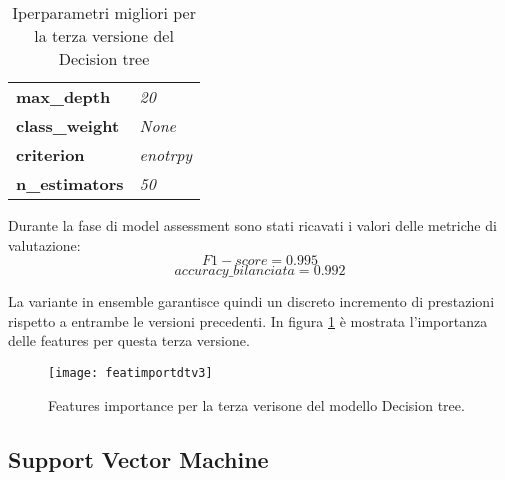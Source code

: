\begin{table}[h] 
\centering
\begin{tabular}{l l}
\hline
\textbf{max\_depth} & \textit{20}\\
\textbf{class\_weight} & \textit{None}\\
\textbf{criterion} & \textit{enotrpy}\\
\textbf{n\_estimators} & \textit{50}\\
\hline
\end{tabular}
\caption{Iperparametri migliori per la terza versione del Decision tree}
\label{tab:dtv3}
\end{table}

Durante la fase di model assessment sono stati ricavati i valori delle metriche di valutazione:
$$F1-score = 0.995$$
$$accuracy\_bilanciata = 0.992$$

La variante in ensemble garantisce quindi un discreto incremento di prestazioni rispetto a entrambe le versioni precedenti. In figura \ref{fig:featuresimportancedtv3} è mostrata l'importanza delle features per questa terza versione.

\begin{figure}[h]
    \centering\texttt{[image: featimportdtv3]}
    \caption{Features importance per la terza verisone del modello Decision tree.}
    \label{fig:featuresimportancedtv3}
\end{figure}

\subsection{Support Vector Machine}
